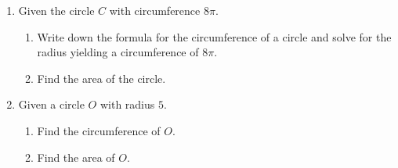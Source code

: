 \documentclass[12pt, twoside]{article}
\begin{document}
\begin{enumerate}
      \item Given the circle $C$ with circumference $8\pi$.
    \begin{enumerate}
      \item Write down the formula for the circumference of a circle and solve for the radius yielding a circumference of $8\pi$. \vspace{1cm}
      \item Find the area of the circle.
    \end{enumerate}

    \item Given a circle $O$ with radius $5$.
    \begin{enumerate}
      \item Find the circumference of $O$. \vspace{2cm}
      \item Find the area of $O$. \vspace{2cm}
    \end{enumerate}



  \end{enumerate}

  
\end{document}
